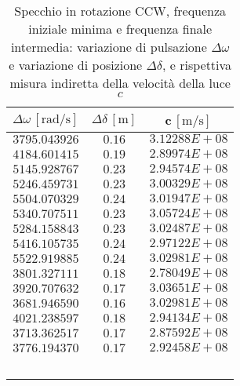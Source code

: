 \documentclass[]{article}
\begin{document}
\begin{table}
    \centering

\begin{tabular}{||c|c|c||}
\hline
$\Delta\omega\, [\text{rad/s}] $ & $\Delta\delta\, [\text{m}] $ & $ $c$\, [\text{m/s}] $ \\
\hline\hline
$3795.043926$ & $0.16 $ & $3.12288E+08$ \\\hline
$4184.601415$ & $0.19 $ & $2.89974E+08$ \\\hline
$5145.928767$ & $0.23 $ & $2.94574E+08$ \\\hline
$5246.459731$ & $0.23 $ & $3.00329E+08$ \\\hline
$5504.070329$ & $0.24 $ & $3.01947E+08$ \\\hline
$5340.707511$ & $0.23 $ & $3.05724E+08$ \\\hline
$5284.158843$ & $0.23 $ & $3.02487E+08$ \\\hline
$5416.105735$ & $0.24 $ & $2.97122E+08$ \\\hline
$5522.919885$ & $0.24 $ & $3.02981E+08$ \\\hline
$3801.327111$ & $0.18 $ & $2.78049E+08$ \\\hline
$3920.707632$ & $0.17 $ & $3.03651E+08$ \\\hline
$3681.946590$ & $0.16 $ & $3.02981E+08$ \\\hline
$4021.238597$ & $0.18 $ & $2.94134E+08$ \\\hline
$3713.362517$ & $0.17 $ & $2.87592E+08$ \\\hline
$3776.194370$ & $0.17 $ & $2.92458E+08$ \\\hline

   \end{tabular}

\caption{Specchio in rotazione CCW, frequenza iniziale minima e frequenza finale intermedia: variazione di pulsazione $\Delta\omega$ e variazione di posizione $\Delta\delta$, e rispettiva misura indiretta della velocità della luce $c$}

\label{CCW_min_mid.csv}

\end{table}
\end{document}
